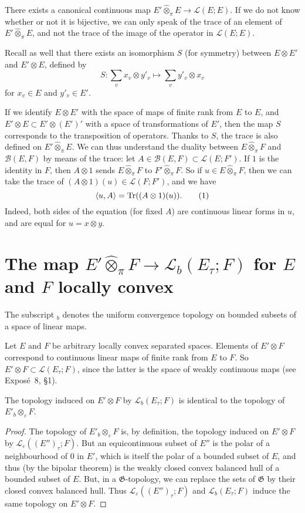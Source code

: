\documentclass{article}
\theoremstyle{plain}
\newenvironment{proposition}[1]
    {\renewcommand\theinnercustomproposition{#1}\innercustomproposition}
    {\endinnercustomproposition}
\theoremstyle{definition}
\newcommand{\BB}{\mathcal{B}}
\newcommand{\LL}{\mathcal{L}}
\newcommand{\injotimes}{{\otimes}_\varepsilon}
\newcommand{\cprojotimes}{\widehat{\otimes}_\pi}
\newcommand{\tr}{\operatorname{Tr}}
\renewcommand{\rangle}{\rotatebox[origin=c]{180}{$\langle$}}
\newcommand{\oldpage}[1]{\marginpar{\footnotesize$\Big\vert$ \textit{p.~#1}}}
\begin{document}
There exists a canonical continuous map $E'\cprojotimes E\to\LL(E;E)$.
If we do not know whether or not it is bijective, we can only speak of the trace of an element of $E'\cprojotimes E$, and not the trace of the image of the operator in $\LL(E;E)$.

Recall as well that there exists an isomorphism $S$ (for symmetry) between $E\otimes E'$ and $E'\otimes E$, defined by
\[
  S\colon \sum_v x_v\otimes y'_v \mapsto \sum_v y'_v\otimes x_v
\]
for $x_v\in E$ and $y'_v\in E'$.

If we identify $E\otimes E'$ with the space of maps of finite rank from $E$ to $E$, and $E'\otimes E\subset E'\otimes(E')'$ with a space of transformations of $E'$,
\oldpage{2}
then the map $S$ corresponds to the transposition of operators.
Thanks to $S$, the trace is also defined on $E'\cprojotimes E$.
We can thus understand the duality between $E\cprojotimes F$ and $\BB(E,F)$ by means of the trace: let $A\in\BB(E,F)\subset\LL(E;F')$.
If $1$ is the identity in $F$, then $A\otimes1$ sends $E\cprojotimes F$ to $F'\cprojotimes F$.
So if $u\in E\cprojotimes F$, then we can take the trace of $(A\otimes1)(u)\in\LL(F;F')$, and we have
\[
\label{equation1}
  \langle u,A \rangle = \tr((A\otimes1)(u)).
  \tag{1}
\]
Indeed, both sides of the equation (for fixed $A$) are continuous linear forms in $u$, and are equal for $u=x\otimes y$.


\section{The map $E'\cprojotimes F\to\LL_b(E_\tau;F)$ for $E$ and $F$ locally convex}
\label{section2}

The subscript ${}_b$ denotes the uniform convergence topology on bounded subsets of a space of linear maps.

Let $E$ and $F$ be arbitrary locally convex separated spaces.
Elements of $E'\otimes F$ correspond to continuous linear maps of finite rank from $E$ to $F$.
So $E'\otimes F\subset\LL(E_\tau;F)$, since the latter is the space of weakly continuous maps (see Exposé~8, §1).

\begin{proposition}{1}
\label{proposition1}
  The topology induced on $E'\otimes F$ by $\LL_b(E_\tau;F)$ is identical to the topology of $E'_b\injotimes F$.
\end{proposition}

\begin{proof}
  The topology of $E'_b\injotimes F$ is, by definition, the topology induced on $E'\otimes F$ by $\LL_\varepsilon((E'')_\tau;F)$.
  But an equicontinuous subset of $E''$ is the  polar of a neighbourhood of $0$ in $E'$, which is itself the polar of a bounded subset of $E$, and thus (by the bipolar theorem) is the weakly closed convex balanced hull of a bounded subset of $E$.
  But, in a $\mathfrak{G}$-topology, we can replace the sets of $\mathfrak{G}$ by their closed convex balanced hull.
  Thus $\LL_\varepsilon((E'')_\tau;F)$ and $\LL_b(E_\tau;F)$ induce the same topology on $E'\otimes F$.
\end{proof}
\end{document}

